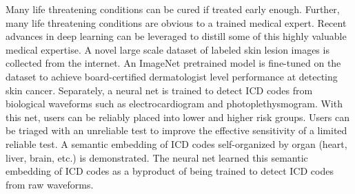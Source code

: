 Many life threatening conditions can be cured if treated early enough.  Further, many life threatening conditions are obvious to a trained medical expert.  Recent advances in deep learning can be leveraged to distill some of this highly valuable medical expertise.  A novel large scale dataset of labeled skin lesion images is collected from the internet. An ImageNet pretrained model is fine-tuned on the dataset to achieve board-certified dermatologist level performance at detecting skin cancer. Separately, a neural net is trained to detect ICD codes from biological waveforms such as electrocardiogram and photoplethysmogram. With this net, users can be reliably placed into lower and higher risk groups. Users can be triaged with an unreliable test to improve the effective sensitivity of a limited reliable test. A semantic embedding of ICD codes self-organized by organ (heart, liver, brain, etc.) is demonstrated. The neural net learned this semantic embedding of ICD codes as a byproduct of being trained to detect ICD codes from raw waveforms.


